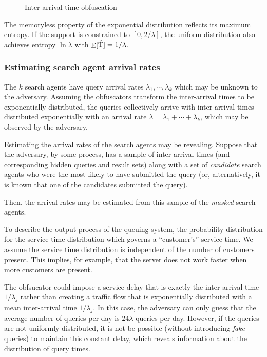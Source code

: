 \documentclass[final,11pt]{article}
\newcommand{\rvhts}[1][]{%
   \ifthenelse{ \equal{#1}{} }
      {\ensuremath{\rv{\check{T}}}}
      {\ensuremath{\rv{\check{T}_{#1}}}}
}
\newcommand{\rv}[1]{\mathrm{#1}}
\DeclareMathOperator{\expectation}{\mathbb{E}}
\numberwithin{equation}{section}
\theoremstyle{plain}
\theoremstyle{remark}
\begin{document}
\begin{figure}
\caption{Inter-arrival time obfuscation}
\label{fig:inter_arrival_perturb}
\center
\def\svgwidth{\textwidth/2}

\end{figure}



The memoryless property of the exponential distribution reflects its maximum entropy. If the support is constrained to $[0, 2/\lambda]$, the uniform distribution also achieves entropy $\ln \lambda$ with $\expectation[\rvhts] = 1/\lambda$.


\subsubsection{Estimating search agent arrival rates}
The $k$ search agents have query arrival rates $\lambda_1, \cdots, \lambda_k$ which may be unknown to the adversary. Assuming the obfuscators transform the inter-arrival times to be exponentially distributed, the queries collectively arrive with inter-arrival times distributed exponentially with an arrival rate $\lambda = \lambda_1 + \cdots + \lambda_k$, which may be observed by the adversary.

Estimating the arrival rates of the search agents may be revealing. Suppose that the adversary, by some process, has a sample of inter-arrival times (and corresponding hidden queries and result sets) along with a set of \emph{candidate} search agents who were the most likely to have submitted the query (or, alternatively, it is known that one of the candidates submitted the query).

Then, the arrival rates may be estimated from this sample of the \emph{masked} search agents.

To describe the output process of the queuing system, the probability distribution for the service time distribution which governs a ``customer’s'' service time. We assume the service time distribution is independent of the number of customers present. This implies, for example, that the server does not work faster when more customers are present.

The obfsucator could impose a service delay that is exactly the inter-arrival time $1 / \lambda_j$ rather than creating a traffic flow that is exponentially distributed with a mean inter-arrival time $1 / \lambda_j$. In this case, the adversary can only guess that the average number of queries per day is $24 \lambda$ queries per day. However, if the queries are not uniformly distributed, it is not be possible (without introducing \emph{fake} queries) to maintain this constant delay, which reveals information about the distribution of query times.
\end{document}
